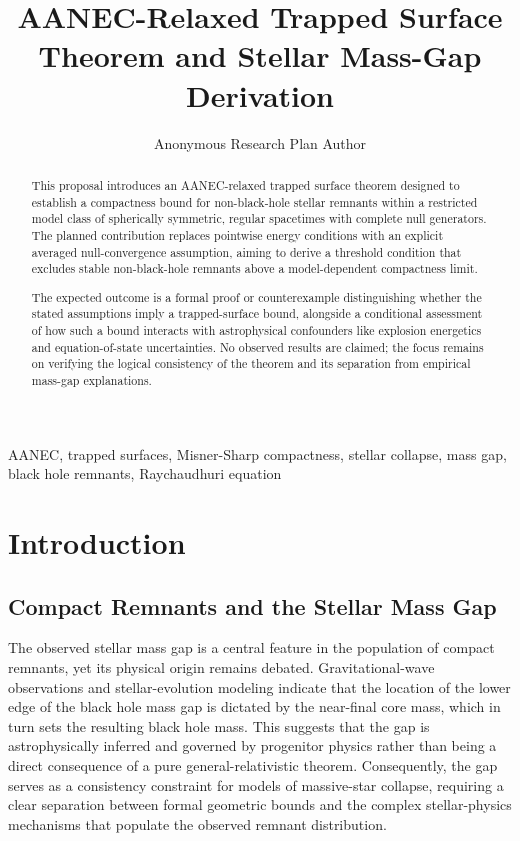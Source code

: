 \documentclass[conference]{IEEEtran}
\begin{document}
\title{AANEC-Relaxed Trapped Surface Theorem and Stellar Mass-Gap Derivation}\author{Anonymous Research Plan Author}\maketitle

\begin{abstract}
This proposal introduces an AANEC-relaxed trapped surface theorem designed to establish a compactness bound for non-black-hole stellar remnants within a restricted model class of spherically symmetric, regular spacetimes with complete null generators. The planned contribution replaces pointwise energy conditions with an explicit averaged null-convergence assumption, aiming to derive a threshold condition that excludes stable non-black-hole remnants above a model-dependent compactness limit.

The expected outcome is a formal proof or counterexample distinguishing whether the stated assumptions imply a trapped-surface bound, alongside a conditional assessment of how such a bound interacts with astrophysical confounders like explosion energetics and equation-of-state uncertainties. No observed results are claimed; the focus remains on verifying the logical consistency of the theorem and its separation from empirical mass-gap explanations.
\end{abstract}
\begin{IEEEkeywords}
AANEC, trapped surfaces, Misner-Sharp compactness, stellar collapse, mass gap, black hole remnants, Raychaudhuri equation
\end{IEEEkeywords}\section{Introduction}
\subsection{Compact Remnants and the Stellar Mass Gap}
The observed stellar mass gap is a central feature in the population of compact remnants, yet its physical origin remains debated. Gravitational-wave observations and stellar-evolution modeling indicate that the location of the lower edge of the black hole mass gap is dictated by the near-final core mass, which in turn sets the resulting black hole mass. This suggests that the gap is astrophysically inferred and governed by progenitor physics rather than being a direct consequence of a pure general-relativistic theorem. Consequently, the gap serves as a consistency constraint for models of massive-star collapse, requiring a clear separation between formal geometric bounds and the complex stellar-physics mechanisms that populate the observed remnant distribution.~\cite{cite_fd0f77b2a173c0ab,cite_7a407c865faafd11}
\end{document}
